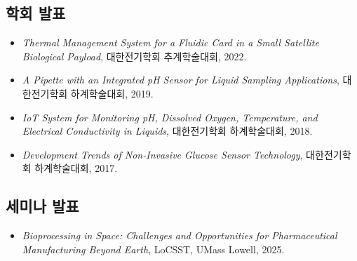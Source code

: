 \documentclass[letterpaper,11pt]{article}
\newcommand{\resumeItem}[1]{
  \item\small{#1 \vspace{-1pt}}
}
\newcommand{\resumeSubHeadingListStart}{\begin{itemize}[leftmargin=*]}
\newcommand{\resumeSubHeadingListEnd}{\end{itemize}}
\begin{document}
\subsection*{\normalsize 학회 발표}
  \resumeSubHeadingListStart
    \resumeItem{\textit{Thermal Management System for a Fluidic Card in a Small Satellite Biological Payload}, 대한전기학회 추계학술대회, 2022.}
    \resumeItem{\textit{A Pipette with an Integrated pH Sensor for Liquid Sampling Applications}, 대한전기학회 하계학술대회, 2019.}
    \resumeItem{\textit{IoT System for Monitoring pH, Dissolved Oxygen, Temperature, and Electrical Conductivity in Liquids}, 대한전기학회 하계학술대회, 2018.}
    \resumeItem{\textit{Development Trends of Non-Invasive Glucose Sensor Technology}, 대한전기학회 하계학술대회, 2017.}
  \resumeSubHeadingListEnd

\subsection*{\normalsize 세미나 발표}
  \resumeSubHeadingListStart
    \resumeItem{\textit{Bioprocessing in Space: Challenges and Opportunities for Pharmaceutical Manufacturing Beyond Earth}, LoCSST, UMass Lowell, 2025.}
  \resumeSubHeadingListEnd

\end{document}
